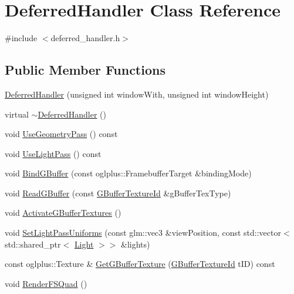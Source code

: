 \hypertarget{class_deferred_handler}{}\section{Deferred\+Handler Class Reference}
\label{class_deferred_handler}


{\ttfamily \#include $<$deferred\+\_\+handler.\+h$>$}

\subsection*{Public Member Functions}
\begin{DoxyCompactItemize}
\item 
\hyperlink{class_deferred_handler_a067f61702c6bf91b1d8bd951da031a6f}{Deferred\+Handler} (unsigned int window\+With, unsigned int window\+Height)
\item 
virtual \hyperlink{class_deferred_handler_aeb2df800949d3bfaf7326d1bb44af0ce}{$\sim$\+Deferred\+Handler} ()
\item 
void \hyperlink{class_deferred_handler_ad5af8e9dc5e2a47e6849af52d6e1943f}{Use\+Geometry\+Pass} () const 
\item 
void \hyperlink{class_deferred_handler_a316f5981198a22454e3d767f72827d4a}{Use\+Light\+Pass} () const 
\item 
void \hyperlink{class_deferred_handler_a9fd622f6cc5addcdd5a93fa31ec73c56}{Bind\+G\+Buffer} (const oglplus\+::\+Framebuffer\+Target \&binding\+Mode)
\item 
void \hyperlink{class_deferred_handler_a4ca3be75245b77738870df6ee469f7d9}{Read\+G\+Buffer} (const \hyperlink{deferred__handler_8h_a331a939e08dff83e0b0b62fbbd39c963}{G\+Buffer\+Texture\+Id} \&g\+Buffer\+Tex\+Type)
\item 
void \hyperlink{class_deferred_handler_a5212123060b8793cdf2aae2e5bb66ef7}{Activate\+G\+Buffer\+Textures} ()
\item 
void \hyperlink{class_deferred_handler_a7da8f85708a2fec2e44cd82d9dddd040}{Set\+Light\+Pass\+Uniforms} (const glm\+::vec3 \&view\+Position, const std\+::vector$<$ std\+::shared\+\_\+ptr$<$ \hyperlink{class_light}{Light} $>$$>$ \&lights)
\item 
const oglplus\+::\+Texture \& \hyperlink{class_deferred_handler_af3a1176c3d6708a8a564194920a89176}{Get\+G\+Buffer\+Texture} (\hyperlink{deferred__handler_8h_a331a939e08dff83e0b0b62fbbd39c963}{G\+Buffer\+Texture\+Id} t\+I\+D) const 
\item 
void \hyperlink{class_deferred_handler_adb21f77f5c42db5112e064e7480afab7}{Render\+F\+S\+Quad} ()
\end{DoxyCompactItemize}
